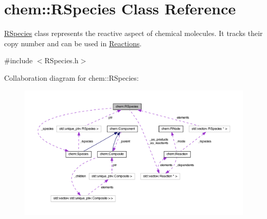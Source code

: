 \hypertarget{classchem_1_1RSpecies}{\section{chem\-:\-:R\-Species Class Reference}
\label{classchem_1_1RSpecies}
}


\hyperlink{classchem_1_1RSpecies}{R\-Species} class represents the reactive aspect of chemical molecules. It tracks their copy number and can be used in \hyperlink{classchem_1_1Reaction}{Reactions}.  




{\ttfamily \#include $<$R\-Species.\-h$>$}



Collaboration diagram for chem\-:\-:R\-Species\-:
\nopagebreak
\begin{figure}[H]
\begin{center}
\leavevmode
\includegraphics[width=350pt]{classchem_1_1RSpecies__coll__graph}
\end{center}
\end{figure}
